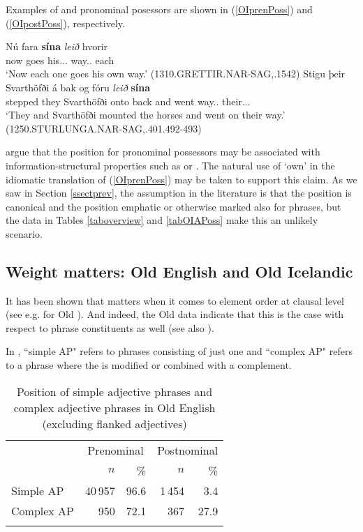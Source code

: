 \documentclass[output=paper,colorlinks,citecolor=brown,draft]{langscibook}
\begin{document}
Examples of  and  pronominal posessors are shown in (\ref{OIprenPoss}) and (\ref{OIpostPoss}), respectively. 

\ea\label{OIprenPoss}
\gll Nú fara \textbf{sína} \textit{leið} hvorir\\
now goes his.\REFL.\ACC.\SG{} way.\ACC.\SG{} each\\
\glt ‘Now each one goes his own way.’ (1310.GRETTIR.NAR-SAG,.1542)
\ex\label{OIpostPoss}
\gll Stigu þeir Svarthöfði á bak og fóru \textit{leið} \textbf{sína}\\
	stepped they Svarthöfði onto back and went way.\ACC.\SG{} their.\REFL.\ACC.\SG{}\\
\glt ‘They and Svarthöfði mounted the horses and went on their way.’ (1250.STURLUNGA.NAR-SAG,.401.492-493)
\z

\citet[19--20]{Borjarsetal16} argue that the  position for pronominal possessors may be associated with information-structural properties such as  or . The natural use of ‘own’ in the idiomatic translation of (\ref{OIprenPoss}) may be taken to support this claim. As we saw in Section \ref{ssectprev}, the assumption in the literature is that the  position is canonical and the  position emphatic or otherwise marked also for  phrases, but the data in Tables \ref{taboverview} and \ref{tabOIAPoss} make this an unlikely scenario.

\subsection{Weight matters: Old English and Old Icelandic}\label{ssectweight}

It has been shown that  matters when it comes to element order at clausal level (see e.g. \cite{TaylorPintzuk2012} for Old ). And indeed, the Old  data indicate that this is the case with respect to  phrase constituents as well (see also \cite{Grabski17}).

In , “simple AP" refers to  phrases consisting of just one  and “complex AP" refers to a phrase where the  is modified or combined with a complement. 

\begin{table}
\caption{Position of simple adjective phrases and complex adjective phrases in Old English (excluding flanked adjectives)}
\label{tabOEweight}

 \begin{tabular}{l rrrr}
  \lsptoprule
  & \multicolumn{2}{c}{Prenominal} & \multicolumn{2}{c}{Postnominal}\\\cmidrule(lr){2-3}\cmidrule(lr){4-5}
  & $n$ & \% & $n$ & \%\\
  \midrule
 Simple AP & 40\,957 & 96.6 & 1\,454 & 3.4\\
 Complex AP & 950 & 72.1 & 367 & 27.9\\
 \lspbottomrule
 \end{tabular}
\end{table}
\end{document}
